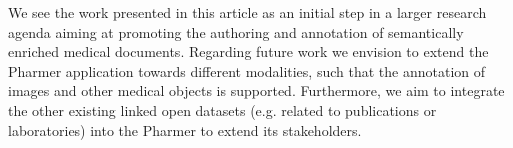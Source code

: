 \documentclass[10pt, conference, compsocconf]{IEEEtran}
\begin{document}
We see the work presented in this article as an initial step in a larger research agenda aiming at promoting the authoring and annotation of semantically enriched medical documents.
Regarding future work we envision to extend the Pharmer application towards different modalities, such that the annotation of images and other medical objects is supported.
Furthermore, we aim to integrate the other existing linked open datasets (e.g. related to publications or laboratories) into the Pharmer to extend its stakeholders.









\end{document}

